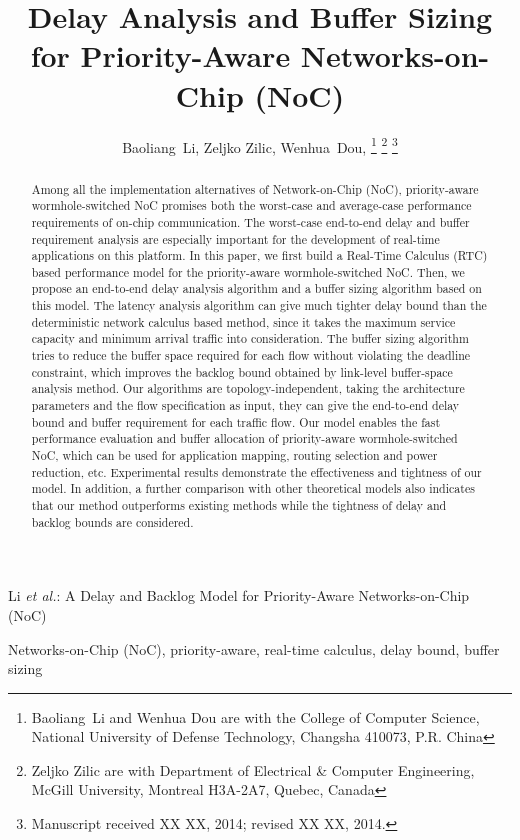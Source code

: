 \documentclass[10pt,journal]{IEEEtran}
\begin{document}
\title{Delay Analysis and Buffer Sizing for Priority-Aware Networks-on-Chip (NoC)}

\author{Baoliang~Li, %
        Zeljko Zilic, %
        Wenhua~Dou, %
\thanks{Baoliang~Li and Wenhua Dou are with the College of Computer Science, National University of Defense Technology, Changsha 410073, P.R. China}%
\thanks{Zeljko Zilic are with Department of Electrical \& Computer Engineering, McGill University, Montreal H3A-2A7, Quebec, Canada}%
\thanks{Manuscript received XX XX, 2014; revised XX XX, 2014.}}

%
{Li \MakeLowercase{\textit{et al.}}: A Delay and Backlog Model for Priority-Aware Networks-on-Chip (NoC)}

\maketitle

\begin{abstract}
Among all the implementation alternatives of Network-on-Chip (NoC), priority-aware wormhole-switched NoC promises both the worst-case and average-case performance requirements of on-chip communication. The worst-case end-to-end delay and buffer requirement analysis are especially important for the development of real-time applications on this platform. In this paper, we first build a Real-Time Calculus (RTC) based performance model for the priority-aware wormhole-switched NoC. Then, we propose an end-to-end delay analysis algorithm and a buffer sizing algorithm based on this model. The latency analysis algorithm can give much tighter delay bound than the deterministic network calculus based method, since it takes the maximum service capacity and minimum arrival traffic into consideration. The buffer sizing algorithm tries to reduce the buffer space required for each flow without violating the deadline constraint, which improves the backlog bound obtained by link-level buffer-space analysis method. Our algorithms are topology-independent, taking the architecture parameters and the flow specification as input, they can give the end-to-end delay bound and buffer requirement for each traffic flow. Our model enables the fast performance evaluation and buffer allocation of priority-aware wormhole-switched NoC, which can be used for application mapping, routing selection and power reduction, etc. Experimental results demonstrate the effectiveness and tightness of our model. In addition, a further comparison with other theoretical models also indicates that our method outperforms existing methods while the tightness of delay and backlog bounds are considered.
\end{abstract}
\begin{IEEEkeywords}
Networks-on-Chip (NoC), priority-aware, real-time calculus, delay bound, buffer sizing
\end{IEEEkeywords}
\end{document}
